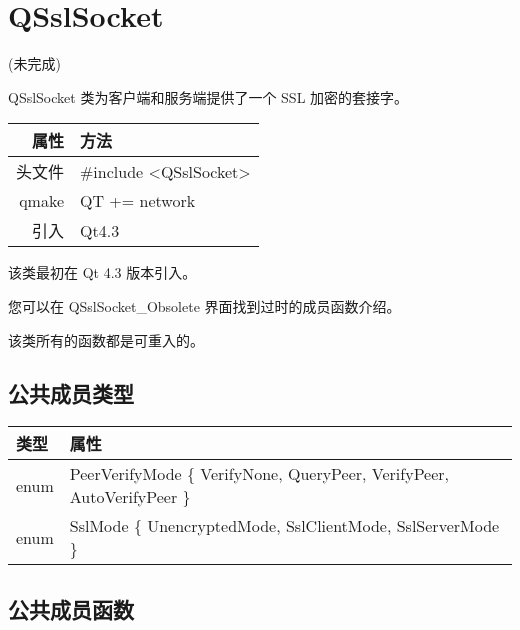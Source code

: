 \chapter{QSslSocket} (未完成)

QSslSocket 类为客户端和服务端提供了一个 SSL 加密的套接字。

\begin{tabular}{|r|l|}
	\hline
	属性 & 方法 \\
	\hline
	头文件 & \#include <QSslSocket>\\      
	\hline
	qmake & QT += network\\      
	\hline
	引入 &	Qt4.3 \\ 
	\hline
\end{tabular}

该类最初在 Qt 4.3 版本引入。

您可以在 QSslSocket\_Obsolete 界面找到过时的成员函数介绍。

\begin{notice}
该类所有的函数都是可重入的。
\end{notice}



\section{公共成员类型}

\begin{tabular}[l]{|l|m{30em}|}
\hline 
类型 &	属性\\ 
\hline 
enum 	&PeerVerifyMode \{ VerifyNone, QueryPeer, VerifyPeer, AutoVerifyPeer \} \\ 
\hline  
enum &	SslMode \{ UnencryptedMode, SslClientMode, SslServerMode \} \\ 
	\hline
\end{tabular}


\section{公共成员函数}

